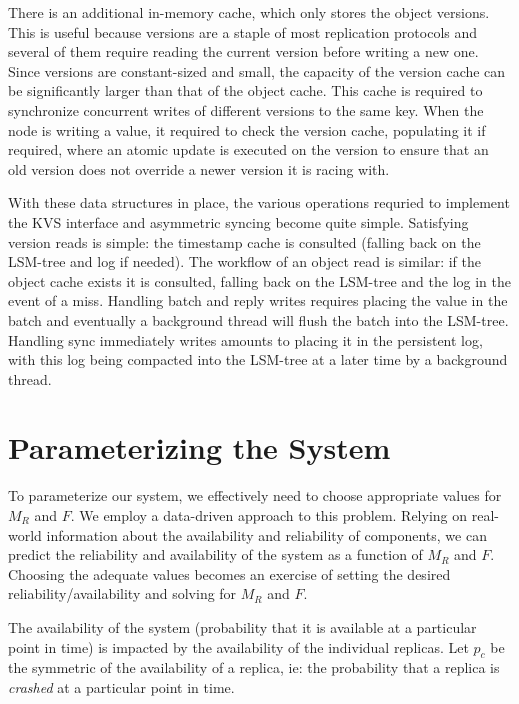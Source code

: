 There is an additional in-memory cache, which only stores the
object versions. This is useful because versions are a staple of
most replication protocols and several of them require reading
the current version before writing a new one. Since versions are
constant-sized and small, the capacity of the version cache can
be significantly larger than that of the object cache. This cache
is required to synchronize concurrent writes of different
versions to the same key. When the node is writing a value, it required to
check the version cache, populating it if required, where an
atomic update is executed on the version to ensure that an old
version does not override a newer version it is racing with.

With these data structures in place, the various operations
requried to implement the \ac{KVS} interface and asymmetric
syncing become quite simple. Satisfying version reads is simple:
the timestamp cache is consulted (falling back on the
\ac{LSM-tree} and log if needed). The workflow of an object read
is similar: if the object cache exists it is consulted, falling
back on the \ac{LSM-tree} and the log in the event of a miss.
Handling batch and reply writes requires placing the value
in the batch and eventually a background thread will flush the
batch into the \ac{LSM-tree}. Handling sync immediately writes
amounts to placing it in the persistent log, with this log being
compacted into the \ac{LSM-tree} at a later time by a background
thread.


\section{Parameterizing the System}\label{sec:r2s2parameterization}

To parameterize our system, we effectively need to choose
appropriate values for $M_R$ and $F$. We employ a data-driven
approach to this problem. Relying on real-world information about
the availability and reliability of components, we can predict
the reliability and availability of the system as a function of
$M_R$ and $F$. Choosing the adequate values becomes an exercise of
setting the desired reliability/availability and solving for $M_R$
and $F$.

The availability of the system (probability that it is available
at a particular point in time) is impacted by the availability of
the individual replicas. Let $p_c$ be the symmetric of the
availability of a replica, ie: the probability that a replica is
\emph{crashed} at a particular point in time.

